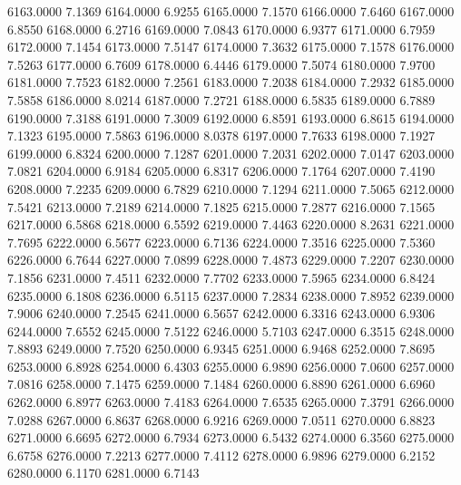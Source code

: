 6163.0000      7.1369
6164.0000      6.9255
6165.0000      7.1570
6166.0000      7.6460
6167.0000      6.8550
6168.0000      6.2716
6169.0000      7.0843
6170.0000      6.9377
6171.0000      6.7959
6172.0000      7.1454
6173.0000      7.5147
6174.0000      7.3632
6175.0000      7.1578
6176.0000      7.5263
6177.0000      6.7609
6178.0000      6.4446
6179.0000      7.5074
6180.0000      7.9700
6181.0000      7.7523
6182.0000      7.2561
6183.0000      7.2038
6184.0000      7.2932
6185.0000      7.5858
6186.0000      8.0214
6187.0000      7.2721
6188.0000      6.5835
6189.0000      6.7889
6190.0000      7.3188
6191.0000      7.3009
6192.0000      6.8591
6193.0000      6.8615
6194.0000      7.1323
6195.0000      7.5863
6196.0000      8.0378
6197.0000      7.7633
6198.0000      7.1927
6199.0000      6.8324
6200.0000      7.1287
6201.0000      7.2031
6202.0000      7.0147
6203.0000      7.0821
6204.0000      6.9184
6205.0000      6.8317
6206.0000      7.1764
6207.0000      7.4190
6208.0000      7.2235
6209.0000      6.7829
6210.0000      7.1294
6211.0000      7.5065
6212.0000      7.5421
6213.0000      7.2189
6214.0000      7.1825
6215.0000      7.2877
6216.0000      7.1565
6217.0000      6.5868
6218.0000      6.5592
6219.0000      7.4463
6220.0000      8.2631
6221.0000      7.7695
6222.0000      6.5677
6223.0000      6.7136
6224.0000      7.3516
6225.0000      7.5360
6226.0000      6.7644
6227.0000      7.0899
6228.0000      7.4873
6229.0000      7.2207
6230.0000      7.1856
6231.0000      7.4511
6232.0000      7.7702
6233.0000      7.5965
6234.0000      6.8424
6235.0000      6.1808
6236.0000      6.5115
6237.0000      7.2834
6238.0000      7.8952
6239.0000      7.9006
6240.0000      7.2545
6241.0000      6.5657
6242.0000      6.3316
6243.0000      6.9306
6244.0000      7.6552
6245.0000      7.5122
6246.0000      5.7103
6247.0000      6.3515
6248.0000      7.8893
6249.0000      7.7520
6250.0000      6.9345
6251.0000      6.9468
6252.0000      7.8695
6253.0000      6.8928
6254.0000      6.4303
6255.0000      6.9890
6256.0000      7.0600
6257.0000      7.0816
6258.0000      7.1475
6259.0000      7.1484
6260.0000      6.8890
6261.0000      6.6960
6262.0000      6.8977
6263.0000      7.4183
6264.0000      7.6535
6265.0000      7.3791
6266.0000      7.0288
6267.0000      6.8637
6268.0000      6.9216
6269.0000      7.0511
6270.0000      6.8823
6271.0000      6.6695
6272.0000      6.7934
6273.0000      6.5432
6274.0000      6.3560
6275.0000      6.6758
6276.0000      7.2213
6277.0000      7.4112
6278.0000      6.9896
6279.0000      6.2152
6280.0000      6.1170
6281.0000      6.7143
